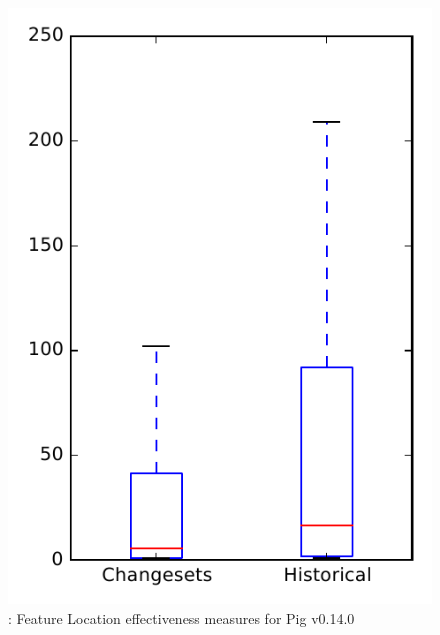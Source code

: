 
\begin{figure}
\centering
\includegraphics[height=0.4\textheight]{figures/flt/rq2_pig_no_outlier}
\caption{\ftwo: Feature Location effectiveness measures for Pig v0.14.0}
\label{fig:flt:rq2:pig}
\end{figure}
